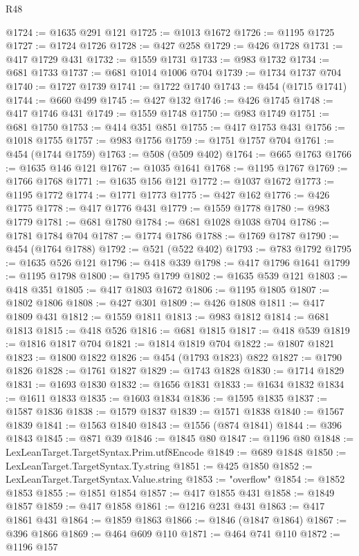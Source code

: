 \begin{lexlean}{R48}
\begin{coremodule}
@1724 := @1635 @291 @121
@1725 := @1013 @1672
@1726 := @1195 @1725
@1727 := @1724 @1726
@1728 := @427 @258
@1729 := @426 @1728
@1731 := @417 @1729 @431
@1732 := @1559 @1731
@1733 := @983 @1732
@1734 := @681 @1733
@1737 := @681 @1014 @1006 @704
@1739 := @1734 @1737 @704
@1740 := @1727 @1739
@1741 := @1722 @1740
@1743 := @454 (@1715 @1741)
@1744 := @660 @499
@1745 := @427 @132
@1746 := @426 @1745
@1748 := @417 @1746 @431
@1749 := @1559 @1748
@1750 := @983 @1749
@1751 := @681 @1750
@1753 := @414 @351 @851
@1755 := @417 @1753 @431
@1756 := @1018 @1755
@1757 := @983 @1756
@1759 := @1751 @1757 @704
@1761 := @454 (@1744 @1759)
@1763 := @508 (@509 @402)
@1764 := @665 @1763
@1766 := @1635 @146 @121
@1767 := @1035 @1641
@1768 := @1195 @1767
@1769 := @1766 @1768
@1771 := @1635 @156 @121
@1772 := @1037 @1672
@1773 := @1195 @1772
@1774 := @1771 @1773
@1775 := @427 @162
@1776 := @426 @1775
@1778 := @417 @1776 @431
@1779 := @1559 @1778
@1780 := @983 @1779
@1781 := @681 @1780
@1784 := @681 @1028 @1038 @704
@1786 := @1781 @1784 @704
@1787 := @1774 @1786
@1788 := @1769 @1787
@1790 := @454 (@1764 @1788)
@1792 := @521 (@522 @402)
@1793 := @783 @1792
@1795 := @1635 @526 @121
@1796 := @418 @339
@1798 := @417 @1796 @1641
@1799 := @1195 @1798
@1800 := @1795 @1799
@1802 := @1635 @539 @121
@1803 := @418 @351
@1805 := @417 @1803 @1672
@1806 := @1195 @1805
@1807 := @1802 @1806
@1808 := @427 @301
@1809 := @426 @1808
@1811 := @417 @1809 @431
@1812 := @1559 @1811
@1813 := @983 @1812
@1814 := @681 @1813
@1815 := @418 @526
@1816 := @681 @1815
@1817 := @418 @539
@1819 := @1816 @1817 @704
@1821 := @1814 @1819 @704
@1822 := @1807 @1821
@1823 := @1800 @1822
@1826 := @454 (@1793 @1823) @822
@1827 := @1790 @1826
@1828 := @1761 @1827
@1829 := @1743 @1828
@1830 := @1714 @1829
@1831 := @1693 @1830
@1832 := @1656 @1831
@1833 := @1634 @1832
@1834 := @1611 @1833
@1835 := @1603 @1834
@1836 := @1595 @1835
@1837 := @1587 @1836
@1838 := @1579 @1837
@1839 := @1571 @1838
@1840 := @1567 @1839
@1841 := @1563 @1840
@1843 := @1556 (@874 @1841)
@1844 := @396 @1843
@1845 := @871 @39
@1846 := @1845 @80
@1847 := @1196 @80
@1848 := LexLeanTarget.TargetSyntax.Prim.utf8Encode
@1849 := @689 @1848
@1850 := LexLeanTarget.TargetSyntax.Ty.string
@1851 := @425 @1850
@1852 := LexLeanTarget.TargetSyntax.Value.string
@1853 := "overflow"
@1854 := @1852 @1853
@1855 := @1851 @1854
@1857 := @417 @1855 @431
@1858 := @1849 @1857
@1859 := @417 @1858
@1861 := @1216 @231 @431
@1863 := @417 @1861 @431
@1864 := @1859 @1863
@1866 := @1846 (@1847 @1864)
@1867 := @396 @1866
@1869 := @464 @609 @110
@1871 := @464 @741 @110
@1872 := @1196 @157

\end{coremodule}
\end{lexlean}
